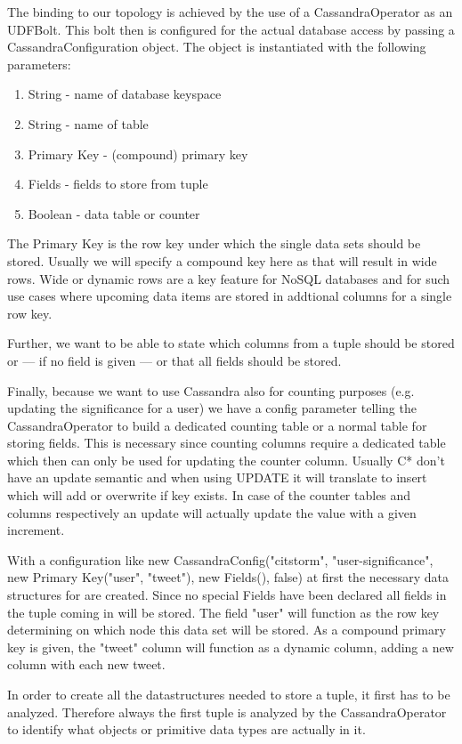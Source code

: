 The binding to our topology is achieved by the use of a CassandraOperator as an UDFBolt. This bolt then is configured for the actual database access by passing a CassandraConfiguration object. The object is instantiated with the following parameters:
\begin{enumerate}
  \item String - name of database keyspace
  \item String - name of table
  \item Primary Key - (compound) primary key
  \item Fields - fields to store from tuple
  \item Boolean - data table or counter
\end{enumerate}
  
The Primary Key is the row key under which the single data sets should be stored. Usually we will specify a compound key here as that will result in wide rows. Wide or dynamic rows are a key feature for NoSQL databases and for such use cases where upcoming data items are stored in addtional columns for a single row key. 

Further, we want to be able to state which columns from a tuple should be stored or --- if no field is given --- or that all fields should be stored. 

Finally, because we want to use Cassandra also for counting purposes (e.g. updating the significance for a user) we have a config parameter telling the CassandraOperator to build a dedicated counting table or a normal table for storing fields. This is necessary since counting columns require a dedicated table which then can only be used for updating the counter column. Usually C* don't have an update semantic and when using UPDATE it will translate to insert which will add or overwrite if key exists. In case of the counter tables and columns respectively an update will actually update the value with a given increment.

With a configuration like new CassandraConfig("citstorm", "user-significance", new Primary Key("user", "tweet"), new Fields(), false) at first the necessary data structures for are created. Since no special Fields have been declared all fields in the tuple coming in will be stored. The field "user" will function as the row key determining on which node this data set will be stored. As a compound primary key is given, the "tweet" column will function as a dynamic column, adding a new column with each new tweet.

In order to create all the datastructures needed to store a tuple, it first has to be analyzed. Therefore always the first tuple is analyzed by the CassandraOperator to identify what objects or primitive data types are actually in it. 

